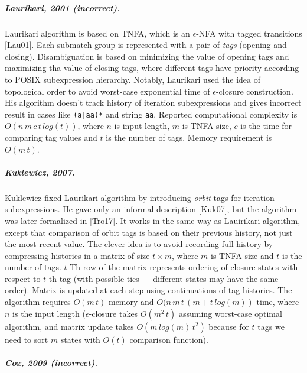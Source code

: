 \documentclass[AMA,STIX1COL]{WileyNJD-v2}
\begin{document}
\subparagraph{Laurikari, 2001 (incorrect).}

Laurikari algorithm is based on TNFA, which is an $\epsilon$-NFA with tagged transitions [Lau01].
Each submatch group is represented with a pair of \emph{tags} (opening and closing).
Disambiguation is based on minimizing the value of opening tags and maximizing tha value of closing tags, where
different tags have priority according to POSIX subexpression hierarchy.
Notably, Laurikari used the idea of topological order to avoid worst-case exponential time of $\epsilon$-closure construction.
His algorithm doesn't track history of iteration subexpressions and gives incorrect result in cases like \texttt{(a|aa)*} and string \texttt{aa}.
Reported computational complexity is $O(n \, m \, c \, t \, log(t))$, where
$n$ is input length,
$m$ is TNFA size,
$c$ is the time for comparing tag values
and $t$ is the number of tags.
Memory requirement is $O(m \, t)$.

\subparagraph{Kuklewicz, 2007.}

Kuklewicz fixed Laurikari algorithm by introducing \emph{orbit} tags for iteration subexpressions.
He gave only an informal description [Kuk07], but the algorithm was later formalized in [Tro17].
It works in the same way as Lauirikari algorithm,
except that comparison of orbit tags is based on their previous history, not just the most recent value.
The clever idea is to avoid recording full history
by compressing histories in a matrix of size $t \times m$, where $m$ is TNFA size and $t$ is the number of tags.
$t$-Th row of the matrix represents ordering of closure states with respect to $t$-th tag
(with possible ties --- different states may have the same order).
Matrix is updated at each step using continuations of tag histories.
The algorithm requires $O(m \, t)$ memory and $O(n \, m \, t \, (m + t \, log(m))$ time, where $n$ is the input length
($\epsilon$-closure takes $O(m^2 \, t)$ assuming worst-case optimal algorithm,
and matrix update takes $O(m \, log(m) \, t^2)$ because for $t$ tags we need to sort $m$ states with $O(t)$ comparison function).

\subparagraph{Cox, 2009 (incorrect).}
\end{document}
